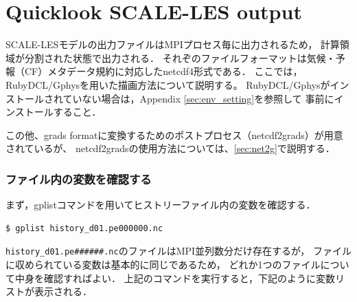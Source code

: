 \section{Quicklook SCALE-LES output}

SCALE-LESモデルの出力ファイルはMPIプロセス毎に出力されるため，
計算領域が分割された状態で出力される．
それぞのファイルフォーマットは気候・予報（CF）メタデータ規約に対応したnetcdf4形式である．
ここでは，RubyDCL/Gphysを用いた描画方法について説明する。
RubyDCL/Gphysがインストールされていない場合は，Appendix \ref{sec:env_setting}を参照して
事前にインストールすること．

この他、grads formatに変換するためのポストプロセス（netcdf2grads）が用意されているが、
netcdf2gradsの使用方法については、\ref{sec:net2g}で説明する．


\subsubsection{ファイル内の変数を確認する}

まず，gplistコマンドを用いてヒストリーファイル内の変数を確認する．

\begin{verbatim}
$ gplist history_d01.pe000000.nc
\end{verbatim}

\verb|history_d01.pe######.nc|のファイルはMPI並列数分だけ存在するが，
ファイルに収められている変数は基本的に同じであるため，
どれか1つのファイルについて中身を確認すればよい．
上記のコマンドを実行すると，下記のように変数リストが表示される．

